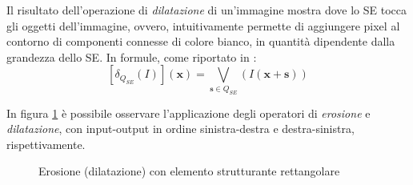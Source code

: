 Il risultato dell'operazione di \textit{dilatazione} di un'immagine mostra dove lo SE tocca gli oggetti dell'immagine, ovvero, intuitivamente permette di aggiungere pixel al contorno di componenti connesse di colore bianco, in quantit\`a dipendente dalla grandezza dello SE. In formule, come riportato in \cite{bib:top-hat-paper}:
\begin{equation}
	\label{eq:dilation}
	[\delta_{Q_{SE}}(I)](\textbf{x}) = \underset{\textbf{s}\in Q_{SE}}{\bigvee}(I(\textbf{x}+\textbf{s}))
\end{equation}\par
In figura \ref{fig:erosion-dilation} \`e possibile osservare l'applicazione degli operatori di \textit{erosione} e \textit{dilatazione}, con input-output in ordine sinistra-destra e destra-sinistra, rispettivamente.
\begin{figure}[h]
	\centering
	\hspace*{15.0pt}
	\caption{Erosione (dilatazione) con elemento strutturante rettangolare} \label{fig:erosion-dilation}
\end{figure}

